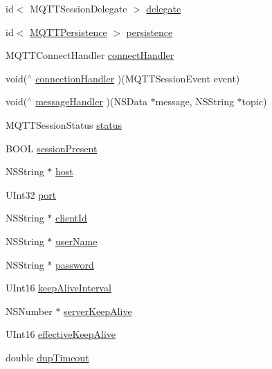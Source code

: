 \begin{DoxyCompactItemize}
\item 
id$<$ M\+Q\+T\+T\+Session\+Delegate $>$ \hyperlink{interface_m_q_t_t_session_a1a8eb040c4fd693c218999bae64d1281}{delegate}
\item 
id$<$ \hyperlink{protocol_m_q_t_t_persistence-p}{M\+Q\+T\+T\+Persistence} $>$ \hyperlink{interface_m_q_t_t_session_ae97bbef7489e0eb1f3bbbc93b02b6f41}{persistence}
\item 
M\+Q\+T\+T\+Connect\+Handler \hyperlink{interface_m_q_t_t_session_a9c836110637be354f6acb52d328035e7}{connect\+Handler}
\item 
void($^\wedge$ \hyperlink{interface_m_q_t_t_session_a96b070cb597ed0857fbf289579c10a58}{connection\+Handler} )(M\+Q\+T\+T\+Session\+Event event)
\item 
void($^\wedge$ \hyperlink{interface_m_q_t_t_session_a0af8d5512fae0ed59e572e9566ac9940}{message\+Handler} )(N\+S\+Data $\ast$message, N\+S\+String $\ast$topic)
\item 
M\+Q\+T\+T\+Session\+Status \hyperlink{interface_m_q_t_t_session_adff1474fe186b8af3bb4cac1ccd4ff2d}{status}
\item 
B\+O\+OL \hyperlink{interface_m_q_t_t_session_ad0712c44abf0f514feb9462779d3e2b8}{session\+Present}
\item 
N\+S\+String $\ast$ \hyperlink{interface_m_q_t_t_session_a72a66b7bf08ab39c71369dc6debf5853}{host}
\item 
U\+Int32 \hyperlink{interface_m_q_t_t_session_a22334eec8bf0b3ba97e2391f70d43320}{port}
\item 
N\+S\+String $\ast$ \hyperlink{interface_m_q_t_t_session_aa426b344bb913f5f338cacb1844dfb6a}{client\+Id}
\item 
N\+S\+String $\ast$ \hyperlink{interface_m_q_t_t_session_a23cc4596889bf5798bf3749ee0a9e61f}{user\+Name}
\item 
N\+S\+String $\ast$ \hyperlink{interface_m_q_t_t_session_a5c0d3fc1c8fbdcb39ba7c7cff8d43a5b}{password}
\item 
U\+Int16 \hyperlink{interface_m_q_t_t_session_aa63e148680fef0724b66218d53caba6d}{keep\+Alive\+Interval}
\item 
N\+S\+Number $\ast$ \hyperlink{interface_m_q_t_t_session_a423d97593b11b2aba0eabbc13ee29011}{server\+Keep\+Alive}
\item 
U\+Int16 \hyperlink{interface_m_q_t_t_session_a18c68ee9ea84d8a008a3893aa8e95f03}{effective\+Keep\+Alive}
\item 
double \hyperlink{interface_m_q_t_t_session_a92914b34c08b83665b838ec9f75f983c}{dup\+Timeout}

\end{DoxyCompactItemize}
